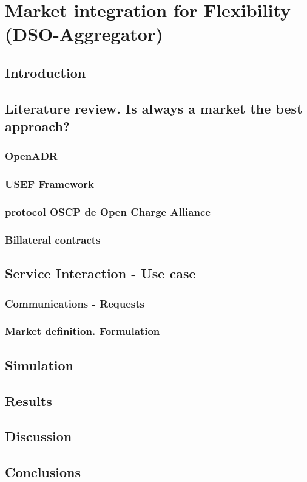 \chapter{Market integration for Flexibility (DSO-Aggregator)}
\label{chapterMarketIntegration}

\section{Introduction}

\section{Literature review. Is always a market the best approach?}
\subsection{OpenADR}
\subsection{USEF Framework}
\subsection{protocol OSCP de Open Charge Alliance}
\subsection{Billateral contracts}

\section{Service Interaction - Use case}
\subsection{Communications - Requests}
\subsection{Market definition. Formulation}
\section{Simulation}
\section{Results}
\section{Discussion}
\section{Conclusions}



